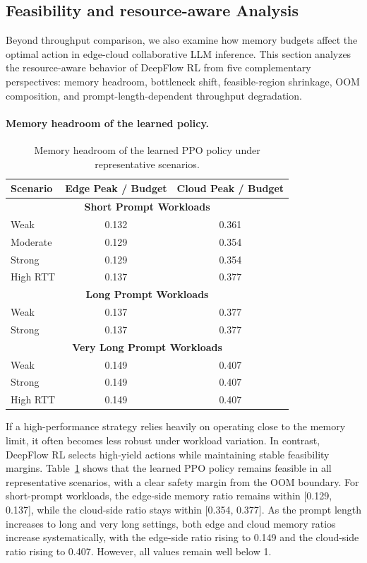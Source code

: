 \documentclass[a4paper,fleqn]{cas-dc}
\begin{document}
\subsection{Feasibility and resource-aware Analysis}

Beyond throughput comparison, we also examine how memory budgets affect the optimal action in edge-cloud collaborative LLM inference. This section analyzes the resource-aware behavior of DeepFlow RL from five complementary perspectives: memory headroom, bottleneck shift, feasible-region shrinkage, OOM composition, and prompt-length-dependent throughput degradation.

\paragraph{Memory headroom of the learned policy.}

\begin{table}[t]
\centering
\caption{Memory headroom of the learned PPO policy under representative scenarios.}
\label{tab:mem_headroom}
\begin{tabular}{lcc}
\toprule
Scenario & Edge Peak / Budget & Cloud Peak / Budget \\
\midrule
\multicolumn{3}{c}{\textbf{Short Prompt Workloads}} \\
Weak      & 0.132 & 0.361 \\
Moderate  & 0.129 & 0.354 \\
Strong    & 0.129 & 0.354 \\
High RTT  & 0.137 & 0.377 \\
\midrule
\multicolumn{3}{c}{\textbf{Long Prompt Workloads}} \\
Weak      & 0.137 & 0.377 \\
Strong    & 0.137 & 0.377 \\
\midrule
\multicolumn{3}{c}{\textbf{Very Long Prompt Workloads}} \\
Weak      & 0.149 & 0.407 \\
Strong    & 0.149 & 0.407 \\
High RTT  & 0.149 & 0.407 \\
\bottomrule
\end{tabular}
\end{table}

If a high-performance strategy relies heavily on operating close to the memory limit, it often becomes less robust under workload variation. In contrast, DeepFlow RL selects high-yield actions while maintaining stable feasibility margins. Table~\ref{tab:mem_headroom} shows that the learned PPO policy remains feasible in all representative scenarios, with a clear safety margin from the OOM boundary. For short-prompt workloads, the edge-side memory ratio remains within [0.129, 0.137], while the cloud-side ratio stays within [0.354, 0.377]. As the prompt length increases to long and very long settings, both edge and cloud memory ratios increase systematically, with the edge-side ratio rising to 0.149 and the cloud-side ratio rising to 0.407. However, all values remain well below 1.
\end{document}
